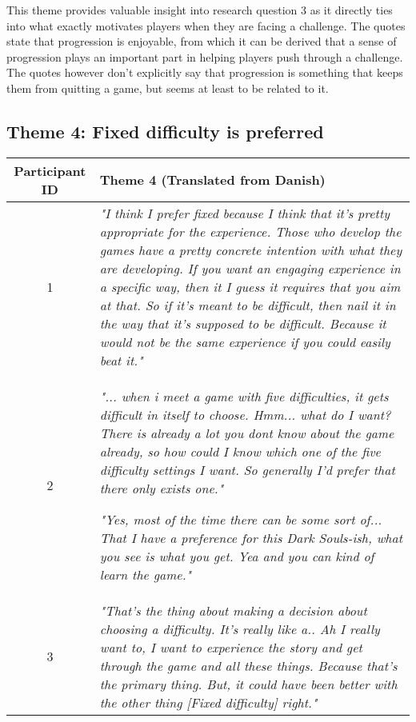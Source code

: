 This theme provides valuable insight into research question 3 as it directly ties into what exactly motivates players when they are facing a challenge. The quotes state that progression is enjoyable, from which it can be derived that a sense of progression plays an important part in helping players push through a challenge. The quotes however don't explicitly say that progression is something that keeps them from quitting a game, but seems at least to be related to it.

\subsection{Theme 4: Fixed difficulty is preferred}\label{Theme 4}
\begin{table}[H]

\centering
\begin{tabular}{@{}c p{11cm}@{}}
\toprule
\textbf{Participant ID} & \textbf{Theme 4} (Translated from Danish)\\
\midrule

1 & \textit{"I think I prefer fixed because I think that it's pretty appropriate for the experience. Those who develop the games have a pretty concrete intention with what they are developing. If you want an engaging experience in a specific way, then it I guess it requires that you aim at that. So if it's meant to be difficult, then nail it in the way that it's supposed to be difficult. Because it would not be the same experience if you could easily beat it."}\\

\midrule

2& \textit{"... when i meet a game with five difficulties, it gets difficult in itself to choose. Hmm... what do I want? There is already a lot you dont know about the game already, so how could I know which one of the five difficulty settings I want. So generally I'd prefer that there only exists one."}

\vspace{0.3cm}

\textit{"Yes, most of the time there can be some sort of... That I have a preference for this Dark Souls-ish, what you see is what you get. Yea and you can kind of learn the game."}\\

\midrule

3& \textit{"That's the thing about making a decision about choosing a difficulty. It's really like a.. Ah I really want to, I want to experience the story and get through the game and all these things. Because that's the primary thing. But, it could have been better with the other thing [Fixed difficulty] right."}\\


\end{tabular}
\end{table}
